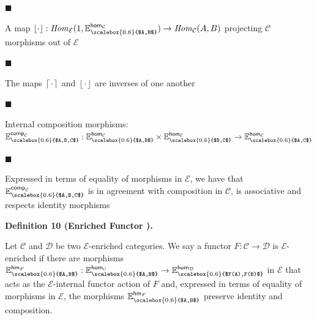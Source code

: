 \documentclass[10pt,a4paper]{article}
\begin{document}
 
 
\par\noindent  $\blacksquare$ 
 
A map $\left\lfloor{\cdot}\right\rfloor:\mathit{Hom}_{\mathcal{E}}(1,\mathbb{E}^{\mathsf{hom}_{\mathcal{C}}}_{\scalebox{0.6}{$A,B$}})\to\mathit{Hom}_{\mathcal{C}}(A,B)$ projecting $\mathcal{C}$ morphisms out of $\mathcal{E}$\par
 
 
 
\par\noindent  $\blacksquare$ 
 
The maps $\left\lceil{\cdot}\right\rceil$ and $\left\lfloor{\cdot}\right\rfloor$ are inverses of one another\par
 
 
 
\par\noindent  $\blacksquare$ 
 
Internal composition morphisms: $\mathbb{E}^{\mathsf{comp}_{\mathcal{C}}}_{\scalebox{0.6}{$A,B,C$}}:\mathbb{E}^{\mathsf{hom}_{\mathcal{C}}}_{\scalebox{0.6}{$A,B$}}\times\mathbb{E}^{\mathsf{hom}_{\mathcal{C}}}_{\scalebox{0.6}{$B,C$}}\to\mathbb{E}^{\mathsf{hom}_{\mathcal{C}}}_{\scalebox{0.6}{$A,C$}}$\par
 
 
 
\par\noindent  $\blacksquare$ 
 
Expressed in terms of equality of morphisms in $\mathcal{E}$, we have that $\mathbb{E}^{\mathsf{comp}_{\mathcal{C}}}_{\scalebox{0.6}{$A,B,C$}}$ is in agreement with composition in $\mathcal{C}$, is associative and respects identity morphisms\par
 
 
  
 
 
 
\par\medskip\noindent\textbf{Definition 10 (Enriched Functor ).}\par
 
 
Let $\mathcal{C}$ and $\mathcal{D}$ be two $\mathcal{E}$-enriched categories. We say a functor $F:\mathcal{C}\to\mathcal{D}$ is $\mathcal{E}$-enriched if there are morphisms $\mathbb{E}^{\mathsf{hm}_{F}}_{\scalebox{0.6}{$A,B$}}:\mathbb{E}^{\mathsf{hom}_{\mathcal{C}}}_{\scalebox{0.6}{$A,B$}}\to\mathbb{E}^{\mathsf{hom}_{\mathcal{D}}}_{\scalebox{0.6}{$F(A),F(B)$}}$ in $\mathcal{E}$ that acts as the $\mathcal{E}$-internal functor action of $F$ and, expressed in terms of equality of morphisms in $\mathcal{E}$, the morphisms $\mathbb{E}^{\mathsf{hm}_{F}}_{\scalebox{0.6}{$A,B$}}$ preserve identity and composition.\par
 
\end{document}
